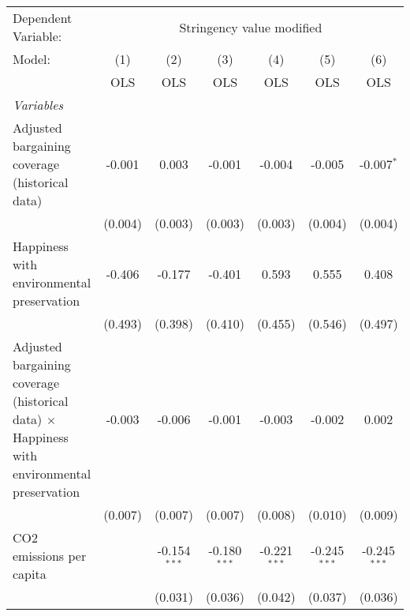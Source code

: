 
\begingroup
\centering
\begin{tabular}{lcccccc}
   \toprule
   Dependent Variable: & \multicolumn{6}{c}{Stringency value modified}\\
   Model:                                                                                             & (1)     & (2)            & (3)            & (4)            & (5)            & (6)\\  
                                                                                                      &  OLS    & OLS            & OLS            & OLS            & OLS            & OLS\\  
   \midrule
   \emph{Variables}\\
   Adjusted bargaining coverage (historical data)                                                     & -0.001  & 0.003          & -0.001         & -0.004         & -0.005         & -0.007$^{*}$\\   
                                                                                                      & (0.004) & (0.003)        & (0.003)        & (0.003)        & (0.004)        & (0.004)\\   
   Happiness with environmental preservation                                                          & -0.406  & -0.177         & -0.401         & 0.593          & 0.555          & 0.408\\   
                                                                                                      & (0.493) & (0.398)        & (0.410)        & (0.455)        & (0.546)        & (0.497)\\   
   Adjusted bargaining coverage (historical data) $\times$ Happiness with environmental preservation  & -0.003  & -0.006         & -0.001         & -0.003         & -0.002         & 0.002\\   
                                                                                                      & (0.007) & (0.007)        & (0.007)        & (0.008)        & (0.010)        & (0.009)\\   
   CO2 emissions per capita                                                                           &         & -0.154$^{***}$ & -0.180$^{***}$ & -0.221$^{***}$ & -0.245$^{***}$ & -0.245$^{***}$\\   
                                                                                                      &         & (0.031)        & (0.036)        & (0.042)        & (0.037)        & (0.036)\\   

\end{tabular}
